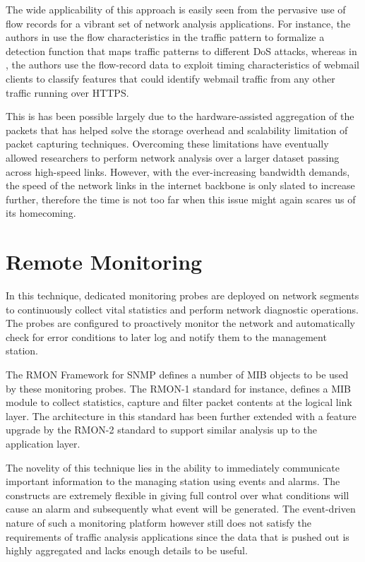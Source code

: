 The wide applicability of this approach is easily seen from the pervasive use of flow records for a vibrant set of network analysis applications. For instance, the authors in \cite{mkim:2004} use the flow characteristics in the traffic pattern to formalize a detection function that maps traffic patterns to different \ac{DoS}  attacks, whereas in \cite{sdominik:2010}, the authors use the flow-record data to exploit timing characteristics of webmail clients to classify features that could identify webmail traffic from any other traffic running over HTTPS.

This is has been possible largely due to the hardware-assisted aggregation of the packets that has helped solve the storage overhead and  scalability limitation of packet capturing techniques. Overcoming these limitations have eventually allowed researchers to perform network analysis over a larger dataset passing across high-speed links. However, with the ever-increasing bandwidth demands, the speed of the network links in the internet backbone is only slated to increase further, therefore the time is not too far when this issue might again scares us of its homecoming. 

\section{Remote Monitoring}\label{sec:remote-monitoring}
In this technique, dedicated monitoring probes are deployed on network segments to continuously collect vital statistics and perform network diagnostic operations. The probes are configured to proactively monitor the network and automatically check for error conditions to later log and notify them to the management station. 

The \ac{RMON} Framework \cite{rfc3577} for \ac{SNMP} \cite{rfc1157} defines a number of \ac{MIB} objects to be used by these monitoring probes. The \ac{RMON}-1 standard \cite{rfc2819} for instance, defines a \ac{MIB}  module to collect statistics, capture and filter packet contents at the logical link layer. The architecture in this standard has been further extended with a feature upgrade by the \ac{RMON}-2 standard \cite{rfc4502} to support similar analysis up to the application layer.

The novelity of this technique lies in the ability to immediately communicate important information to the managing station using events and alarms. The constructs are extremely flexible in giving full control over what conditions will cause an alarm  and subsequently what event will be generated. The event-driven nature of such a monitoring platform however still does not satisfy the requirements of traffic analysis applications since the data that is pushed out is highly aggregated and lacks enough details to be useful. 

